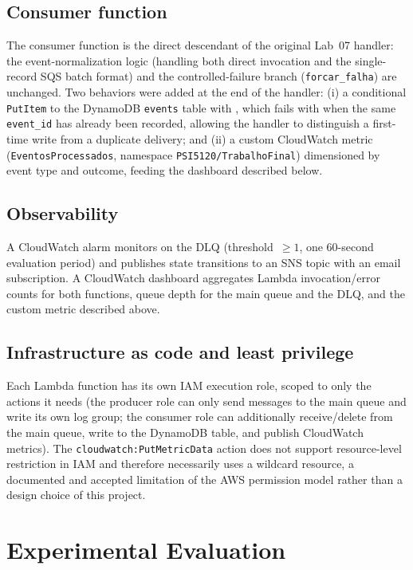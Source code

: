 \documentclass[conference]{IEEEtran}
\begin{document}
\subsection{Consumer function}
The consumer function is the direct descendant of the original Lab~07 handler: the event-normalization logic (handling both direct invocation and the single-record SQS batch format) and the controlled-failure branch (\texttt{forcar\_falha}) are unchanged. Two behaviors were added at the end of the handler: (i) a conditional \texttt{PutItem} to the DynamoDB \texttt{events} table with \texttt{}, which fails with \texttt{} when the same \texttt{event\_id} has already been recorded, allowing the handler to distinguish a first-time write from a duplicate delivery; and (ii) a custom CloudWatch metric (\texttt{EventosProcessados}, namespace \texttt{PSI5120/TrabalhoFinal}) dimensioned by event type and outcome, feeding the dashboard described below.

\subsection{Observability}
A CloudWatch alarm monitors \texttt{} on the DLQ (threshold~$\geq 1$, one 60-second evaluation period) and publishes state transitions to an SNS topic with an email subscription. A CloudWatch dashboard aggregates Lambda invocation/error counts for both functions, queue depth for the main queue and the DLQ, and the custom metric described above.

\subsection{Infrastructure as code and least privilege}
Each Lambda function has its own IAM execution role, scoped to only the actions it needs (the producer role can only send messages to the main queue and write its own log group; the consumer role can additionally receive/delete from the main queue, write to the DynamoDB table, and publish CloudWatch metrics). The \texttt{cloudwatch:PutMetricData} action does not support resource-level restriction in IAM and therefore necessarily uses a wildcard resource, a documented and accepted limitation of the AWS permission model rather than a design choice of this project.

\section{Experimental Evaluation}
\end{document}
